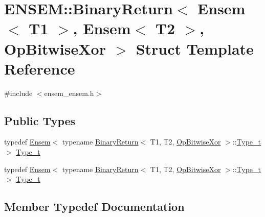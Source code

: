 \hypertarget{structENSEM_1_1BinaryReturn_3_01Ensem_3_01T1_01_4_00_01Ensem_3_01T2_01_4_00_01OpBitwiseXor_01_4}{}\section{E\+N\+S\+EM\+:\+:Binary\+Return$<$ Ensem$<$ T1 $>$, Ensem$<$ T2 $>$, Op\+Bitwise\+Xor $>$ Struct Template Reference}
\label{structENSEM_1_1BinaryReturn_3_01Ensem_3_01T1_01_4_00_01Ensem_3_01T2_01_4_00_01OpBitwiseXor_01_4}


{\ttfamily \#include $<$ensem\+\_\+ensem.\+h$>$}

\subsection*{Public Types}
\begin{DoxyCompactItemize}
\item 
typedef \mbox{\hyperlink{classENSEM_1_1Ensem}{Ensem}}$<$ typename \mbox{\hyperlink{structENSEM_1_1BinaryReturn}{Binary\+Return}}$<$ T1, T2, \mbox{\hyperlink{structENSEM_1_1OpBitwiseXor}{Op\+Bitwise\+Xor}} $>$\+::\mbox{\hyperlink{structENSEM_1_1BinaryReturn_3_01Ensem_3_01T1_01_4_00_01Ensem_3_01T2_01_4_00_01OpBitwiseXor_01_4_abc459c7c3854c531a9ab9e4eaac9a78a}{Type\+\_\+t}} $>$ \mbox{\hyperlink{structENSEM_1_1BinaryReturn_3_01Ensem_3_01T1_01_4_00_01Ensem_3_01T2_01_4_00_01OpBitwiseXor_01_4_abc459c7c3854c531a9ab9e4eaac9a78a}{Type\+\_\+t}}
\item 
typedef \mbox{\hyperlink{classENSEM_1_1Ensem}{Ensem}}$<$ typename \mbox{\hyperlink{structENSEM_1_1BinaryReturn}{Binary\+Return}}$<$ T1, T2, \mbox{\hyperlink{structENSEM_1_1OpBitwiseXor}{Op\+Bitwise\+Xor}} $>$\+::\mbox{\hyperlink{structENSEM_1_1BinaryReturn_3_01Ensem_3_01T1_01_4_00_01Ensem_3_01T2_01_4_00_01OpBitwiseXor_01_4_abc459c7c3854c531a9ab9e4eaac9a78a}{Type\+\_\+t}} $>$ \mbox{\hyperlink{structENSEM_1_1BinaryReturn_3_01Ensem_3_01T1_01_4_00_01Ensem_3_01T2_01_4_00_01OpBitwiseXor_01_4_abc459c7c3854c531a9ab9e4eaac9a78a}{Type\+\_\+t}}
\end{DoxyCompactItemize}


\subsection{Member Typedef Documentation}
\mbox{\label{structENSEM_1_1BinaryReturn_3_01Ensem_3_01T1_01_4_00_01Ensem_3_01T2_01_4_00_01OpBitwiseXor_01_4_abc459c7c3854c531a9ab9e4eaac9a78a}} 
